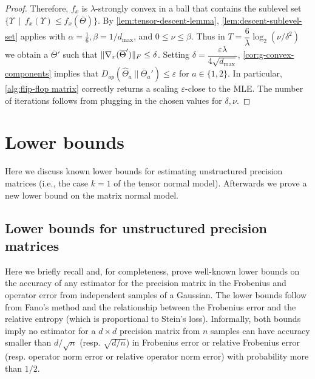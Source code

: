 \documentclass[aos]{imsart}
\theoremstyle{definition}
\numberwithin{equation}{section}
\DeclarePairedDelimiter{\norm}{\lVert}{\rVert}
\newcommand{\otheta}{\overline{\Theta}}
\newcommand{\htheta}{\widehat{\Theta}}
\newcommand{\eps}{\varepsilon}
\def\dmax{d_{\max}}
\newcommand{\CF}[1]{{\color{purple}[CF: #1]}}
\begin{document}
\begin{proof}
Therefore, $f_x$ is $\lambda$-strongly convex in a ball that contains the sublevel set $\{ \Upsilon \ \mid \ f_x(\Upsilon) \leq f_x(\otheta) \}$. By \cref{lem:tensor-descent-lemma}, \cref{lem:descent-sublevel-set} applies with $\alpha = \frac{1}{6}, \beta = 1/\dmax$, and $0 \leq \nu \leq \beta$. Thus in $T = \dfrac{6}{\lambda} \log_2(\nu/\delta^2)$ we obtain a  $\otheta'$ such that $\norm{\nabla_x(\otheta')}_F \leq \delta$. Setting $\delta = \dfrac{\varepsilon \lambda}{4 \sqrt{\dmax}}$, \cref{cor:g-convex-components} implies that $D_{op}(\htheta_a \ || \ \otheta_a') \leq \varepsilon$ for $a \in \{1, 2\}$. In particular, \cref{alg:flip-flop matrix} correctly returns a scaling $\eps$-close to the MLE. The number of iterations follows from plugging in the chosen values for $\delta, \nu$.
\end{proof}

\section{Lower bounds}\label{sec:lower}
Here we discuss known lower bounds for estimating unstructured precision matrices (i.e., the case $k= 1$ of the tensor normal model). Afterwards we prove a new lower bound on the matrix normal model.
\subsection{Lower bounds for unstructured precision matrices}
Here we briefly recall and, for completeness, prove well-known lower bounds on the accuracy of any estimator for the precision matrix in the Frobenius and operator error from independent samples of a Gaussian. The lower bounds follow from Fano's method and the relationship between the Frobenius error and the relative entropy (which is proportional to Stein's loss). 
Informally, both bounds imply no estimator for a $d\times d$ precision matrix from $n$ samples can have accuracy smaller than $d/\sqrt{n}$ (resp. $\sqrt{d/n}$) in Frobenius error or relative Frobenius error (resp. operator norm error or relative operator norm error) with probability more than $1/2$.
\end{document}
